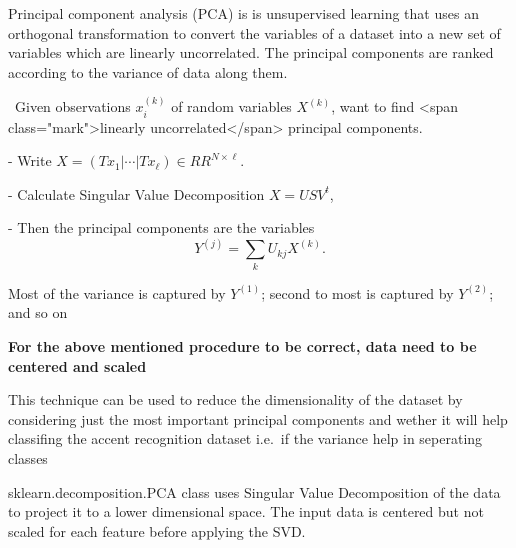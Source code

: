 \documentclass[11pt]{article}
\begin{document}
    Principal component analysis (PCA) is is unsupervised learning that uses
an orthogonal transformation to convert the variables of a dataset into
a new set of variables which are linearly uncorrelated. The principal
components are ranked according to the variance of data along them.

\begin{definition}\
  Given observations $x_i^{(k)}$ of random variables $X^{(k)}$, want
  to find <span class="mark">linearly uncorrelated</span> principal components.

  - Write $X = (T{x}_1 | \cdots | T{x}_\ell) \in RR^{N \times \ell}$.
  
  - Calculate Singular Value Decomposition $X = U S V^t$, 
  
  - Then the principal components are the variables \[ Y^{(j)} = \sum_k U_{kj} X^{(k)}. \]

\end{definition}

Most of the variance is captured by \(Y^{(1)}\); second to most is
captured by \(Y^{(2)}\); and so on

\textbf{For the above mentioned procedure to be correct, data need to be
centered and scaled}

This technique can be used to reduce the dimensionality of the dataset
by considering just the most important principal components and wether
it will help classifing the accent recognition dataset i.e.~if the
variance help in seperating classes

sklearn.decomposition.PCA class uses Singular Value Decomposition of the
data to project it to a lower dimensional space. The input data is
centered but not scaled for each feature before applying the SVD.
\end{document}
